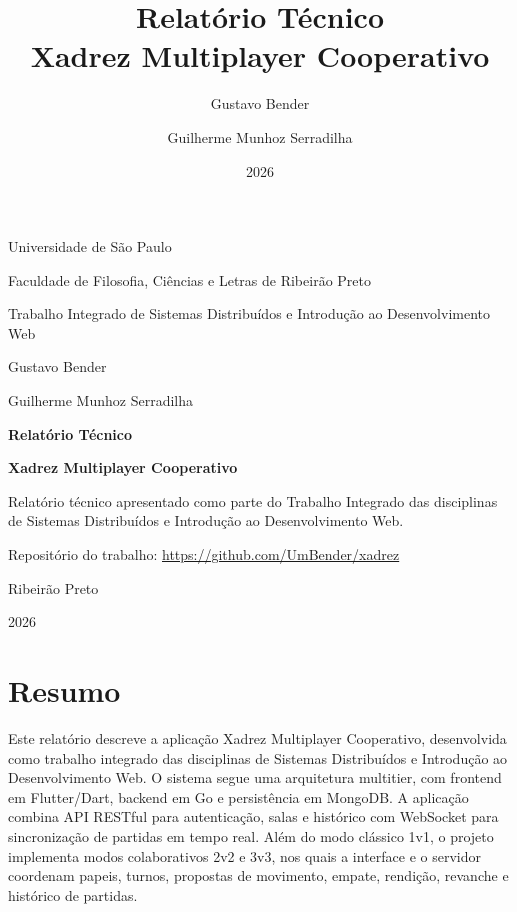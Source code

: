 \documentclass[12pt]{article}
\title{Relatório Técnico\\Xadrez Multiplayer Cooperativo}
\author{Gustavo Bender \and Guilherme Munhoz Serradilha}
\date{2026}
\begin{document}
\begin{titlepage}
    \thispagestyle{empty}
    \centering

    {\large Universidade de São Paulo\par}
    {\large Faculdade de Filosofia, Ciências e Letras de Ribeirão Preto\par}
    {\large Trabalho Integrado de Sistemas Distribuídos e Introdução ao Desenvolvimento Web\par}

    \vspace{3cm}

    {\large Gustavo Bender\par}
    {\large Guilherme Munhoz Serradilha\par}

    \vfill

    {\Large\bfseries Relatório Técnico\par}
    \vspace{0.5cm}
    {\Large\bfseries Xadrez Multiplayer Cooperativo\par}

    \vspace{2cm}

    \begin{flushright}
        \begin{minipage}{0.55\textwidth}
            Relatório técnico apresentado como parte do Trabalho Integrado das disciplinas de Sistemas Distribuídos e Introdução ao Desenvolvimento Web.
            \vspace{0.4cm}

            Repositório do trabalho: \url{https://github.com/UmBender/xadrez}
        \end{minipage}
    \end{flushright}

    \vfill

    {\large Ribeirão Preto\par}
    {\large 2026\par}
\end{titlepage}

\clearpage
\thispagestyle{empty}
\tableofcontents
\clearpage

\section*{Resumo}
Este relatório descreve a aplicação Xadrez Multiplayer Cooperativo, desenvolvida como trabalho integrado das disciplinas de Sistemas Distribuídos e Introdução ao Desenvolvimento Web. O sistema segue uma arquitetura multitier, com frontend em Flutter/Dart, backend em Go e persistência em MongoDB. A aplicação combina API RESTful para autenticação, salas e histórico com WebSocket para sincronização de partidas em tempo real. Além do modo clássico 1v1, o projeto implementa modos colaborativos 2v2 e 3v3, nos quais a interface e o servidor coordenam papeis, turnos, propostas de movimento, empate, rendição, revanche e histórico de partidas.
\end{document}
